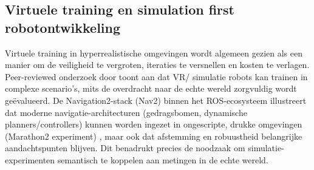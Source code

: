 \subsection{Virtuele training en simulation first robotontwikkeling}
Virtuele training in hyperrealistische omgevingen wordt algemeen gezien als een manier om de veiligheid te vergroten, iteraties te versnellen en kosten te verlagen. 
Peer-reviewed onderzoek door \textcite{Fareed2024} toont aan dat VR/ simulatie robots kan trainen in complexe scenario’s, mits de overdracht naar de echte wereld zorgvuldig wordt geëvalueerd. 
De Navigation2-stack (Nav2) binnen het ROS-ecosysteem illustreert dat moderne navigatie-architecturen (gedragsbomen, dynamische planners/controllers) kunnen worden ingezet in ongescripte, drukke omgevingen (Marathon2 experiment) \textcite{Macenski2020}, maar ook dat afstemming en robuustheid belangrijke aandachtspunten blijven. 
Dit benadrukt precies de noodzaak om simulatie-experimenten semantisch te koppelen aan metingen in de echte wereld.

